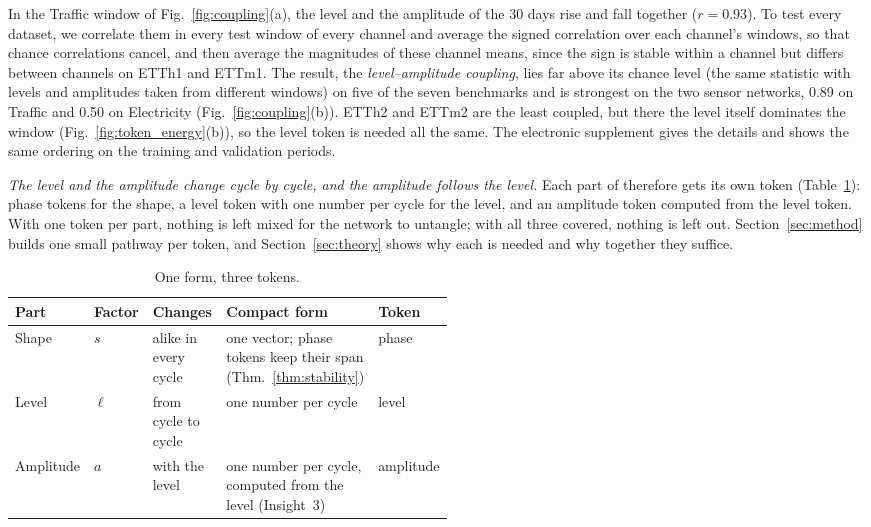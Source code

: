 {
In the Traffic window of Fig.~\ref{fig:coupling}(a), the level and the amplitude of the 30 days rise and fall together ($r=0.93$). To test every dataset, we correlate them in every test window of every channel and average the signed correlation over each channel's windows, so that chance correlations cancel, and then average the magnitudes of these channel means, since the sign is stable within a channel but differs between channels on ETTh1 and ETTm1. The result, the \emph{level--amplitude coupling}, lies far above its chance level (the same statistic with levels and amplitudes taken from different windows) on five of the seven benchmarks and is strongest on the two sensor networks, 0.89 on Traffic and 0.50 on Electricity (Fig.~\ref{fig:coupling}(b)). ETTh2 and ETTm2 are the least coupled, but there the level itself dominates the window (Fig.~\ref{fig:token_energy}(b)), so the level token is needed all the same. The electronic supplement gives the details and shows the same ordering on the training and validation periods.

\emph{The level and the amplitude change cycle by cycle, and the amplitude follows the level.} Each part of  therefore gets its own token (Table~\ref{tab:three_tokens}): phase tokens for the shape, a level token with one number per cycle for the level, and an amplitude token computed from the level token. With one token per part, nothing is left mixed for the network to untangle; with all three covered, nothing is left out. Section~\ref{sec:method} builds one small pathway per token, and Section~\ref{sec:theory} shows why each is needed and why together they suffice.

\begin{table}[t]
\centering
\caption{One form, three tokens.}
\label{tab:three_tokens}
\footnotesize
\setlength{\tabcolsep}{2.5pt}
\begin{tabular}{@{}l l p{0.2\linewidth} p{0.31\linewidth} l@{}}
\toprule
Part & Factor & Changes & Compact form & Token \\
\midrule
Shape & $s$ & alike in every cycle & one vector; phase tokens keep their span (Thm.~\ref{thm:stability}) & phase \\
Level & $\ell$ & from cycle to cycle & one number per cycle & level \\
Amplitude & $a$ & with the level & one number per cycle, computed from the level (Insight~3) & amplitude \\
\bottomrule
\end{tabular}
\end{table}
}
